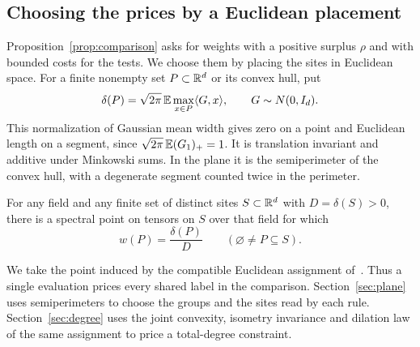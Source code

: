 \subsection{Choosing the prices by a Euclidean placement}
Proposition~\ref{prop:comparison} asks for weights with a positive
surplus \(\rho\) and with bounded costs for the tests. We choose them
by placing the sites in Euclidean space. For a finite nonempty set
\(P\subset\mathbb R^d\) or its convex hull, put
\[
    \delta(P)=\sqrt{2\pi}\,\mathbb E\max_{x\in P}\langle G,x\rangle,
    \qquad G\sim N(0,I_d).
\]
This normalization of Gaussian mean width gives zero on a point and
Euclidean length on a segment, since \(\sqrt{2\pi}\,\mathbb E(G_1)_+=1\).
It is translation invariant and additive under Minkowski sums.
In the plane it is the semiperimeter of the convex hull, with a
degenerate segment counted twice in the perimeter.

\begin{theorem}\label{thm:flat}
For any field and any finite set of distinct sites \(S\subset\mathbb R^d\)
with \(D=\delta(S)>0\), there is a spectral point on tensors on \(S\)
over that field for which
\[
                   w(P)=\frac{\delta(P)}{D}
                   \qquad(\varnothing\ne P\subseteq S).
\]
\end{theorem}

We take the point induced by the compatible Euclidean assignment
of~\cite{oaG}. Thus a single evaluation prices every shared label in
the comparison. Section~\ref{sec:plane} uses semiperimeters to choose
the groups and the sites read by each rule. Section~\ref{sec:degree}
uses the joint convexity, isometry invariance and dilation law of the
same assignment to price a total-degree constraint.
